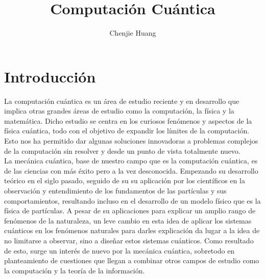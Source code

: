 \documentclass[a4paper]{article}
\title{Computación Cuántica}
\author{Chenjie Huang}
\date{}
\numberwithin{equation}{section}
\begin{document}
\maketitle

\tableofcontents

\newpage

\thispagestyle{empty}

\newpage

\section{Introducción}

La computación cuántica es un área de estudio reciente y en desarrollo que implica otras grandes áreas de estudio como la computación, la física y la matemática. Dicho estudio se centra en los curiosos fenómenos y aspectos de la física cuántica, todo con el objetivo de expandir los límites de la computación. Esto nos ha permitido dar algunas soluciones innovadoras a problemas complejos de la computación sin resolver y desde un punto de vista totalmente nuevo.\\
\linebreak
La mecánica cuántica, base de nuestro campo que es la computación cuántica, es de las ciencias con más éxito pero a la vez desconocida. Empezando su desarrollo teórico en el siglo pasado, seguido de su su aplicación por los científicos en la observación y entendimiento de los fundamentos de las partículas y sus comportamientos, resultando incluso en el desarrollo de un modelo físico que es la física de partículas. A pesar de su aplicaciones para explicar un amplio rango de fenómenos de la naturaleza, un leve cambio en esta idea de aplicar los sistemas cuánticos en los fenómenos naturales para darles explicación da lugar a la idea de no limitarse a observar, sino a diseñar estos sistemas cuánticos. Como resultado de esto, surge un interés de nuevo por la mecánica cuántica, sobretodo en planteamiento de cuestiones que llegan a combinar otros campos de estudio como la computación y la teoría de la información.\\
\linebreak
\end{document}
